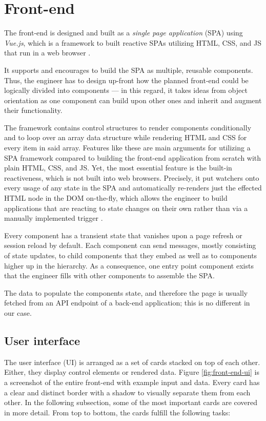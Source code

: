 \documentclass[12pt,a4paper]{report}
\begin{document}
\section{Front-end} \label{sect:implementation-front-end}

The front-end is designed and built as a \textit{single page application} (SPA)
using \textit{Vue.js}, which is a framework to built reactive SPAs utilizing
HTML, CSS, and JS that run in a web browser \cite{vuejs}.

It supports and encourages to build the SPA as multiple, reusable components.
Thus, the engineer has to design up-front how the planned front-end could be
logically divided into components --- in this regard, it takes ideas from
object orientation as one component can build upon other ones and inherit and
augment their functionality.

The framework contains control structures to render components conditionally
and to loop over an array data structure while rendering HTML and CSS for every
item in said array. Features like these are main arguments for utilizing a SPA
framework compared to building the front-end application from scratch with
plain HTML, CSS, and JS. Yet, the most essential feature is the built-in
reactiveness, which is not built into web browsers. Precisely, it put watchers
onto every usage of any state in the SPA and automatically re-renders just the
effected HTML node in the DOM on-the-fly, which allows the engineer to build
applications that are reacting to state changes on their own rather than via a
manually implemented trigger \cite{vuejs}.

Every component has a transient state that vanishes upon a page
refresh or session reload by default. Each component can send messages, mostly
consisting of state updates, to child components that they embed as well as to
components higher up in the hierarchy. As a consequence, one entry point
component exists that the engineer fills with other components to assemble the
SPA.

The data to populate the components state, and therefore the page is usually
fetched from an API endpoint of a back-end application; this is no different in
our case.


\subsection{User interface}

The user interface (UI) is arranged as a set of cards stacked on top of each
other. Either, they display control elements or rendered data. Figure \ref{fig:front-end-ui}
is a screenshot of the entire front-end with example input and data.
Every card has a clear and distinct border with a shadow to visually
separate them from each other. In the following subsection, some of the most
important cards are covered in more detail. From top to bottom, the cards
fulfill the following tasks:
\end{document}
